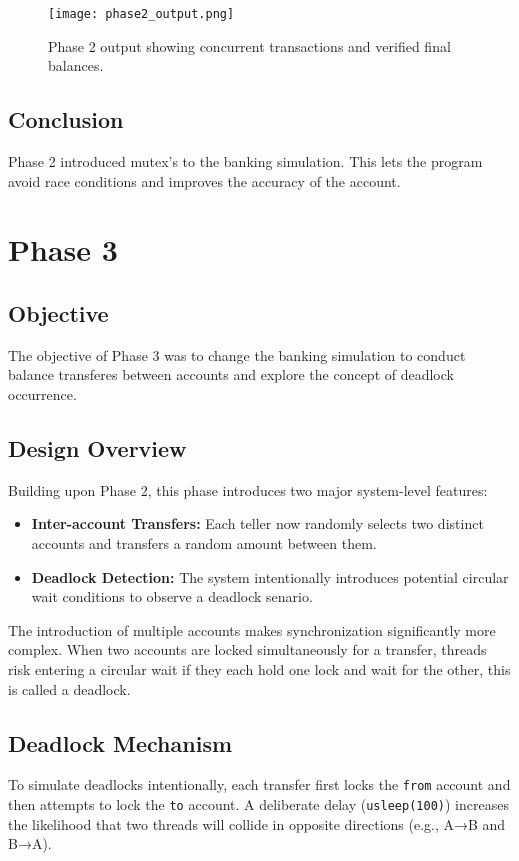 \documentclass[12pt]{article}
\begin{document}
\begin{figure}[H]
  \centering
  \texttt{[image: phase2\_output.png]}
  \caption{Phase 2 output showing concurrent transactions and verified final balances.}
\end{figure}

\subsection{Conclusion}
Phase 2 introduced mutex's to the  banking simulation. This lets the program avoid race conditions and improves the accuracy of the account.


\newpage
\section{Phase 3}

\subsection{Objective}
The objective of Phase 3 was to change the banking simulation to conduct balance transferes between accounts and explore the concept of deadlock occurrence.

\subsection{Design Overview}
Building upon Phase 2, this phase introduces two major system-level features:
\begin{itemize}
  \item \textbf{Inter-account Transfers:} Each teller now randomly selects two distinct accounts and transfers a random amount between them.
  \item \textbf{Deadlock Detection:} The system intentionally introduces potential circular wait conditions to observe a deadlock senario.
\end{itemize}

The introduction of multiple accounts makes synchronization significantly more complex. When two accounts are locked simultaneously for a transfer, threads risk entering a circular wait if they each hold one lock and wait for the other, this is called a deadlock.

\subsection{Deadlock Mechanism}
To simulate deadlocks intentionally, each transfer first locks the \texttt{from} account and then attempts to lock the \texttt{to} account.
A deliberate delay (\texttt{usleep(100)}) increases the likelihood that two threads will collide in opposite directions (e.g., A→B and B→A).
\end{document}
